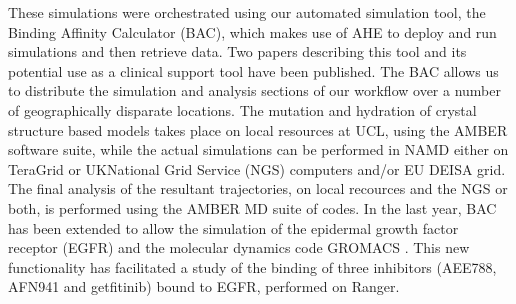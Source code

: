 These simulations were orchestrated using our automated simulation tool, the Binding Affinity Calculator (BAC), which makes use of AHE \cite{coveney2007,zasada2009} to deploy and run simulations and then retrieve data. Two papers describing this tool and its potential use as a clinical support tool have been published\cite{Sadiq2008, Sadiq2008a}. The BAC allows us to distribute the simulation and analysis sections of our workflow over a number of geographically disparate locations. The mutation and hydration of crystal structure based models takes place on local resources at UCL, using the AMBER software suite, while the actual simulations can be performed in NAMD either on TeraGrid or UKNational Grid Service (NGS) computers and/or EU DEISA grid. The final analysis of the resultant trajectories, on local recources and the NGS or both, is performed using the AMBER MD suite of codes. In the last year, BAC has been extended to allow the simulation of the epidermal growth factor receptor (EGFR) and the molecular dynamics code GROMACS \cite{Hess2008}. This new functionality has facilitated a study of the binding of three inhibitors (AEE788, AFN941 and getfitinib) bound to EGFR, performed on Ranger.

